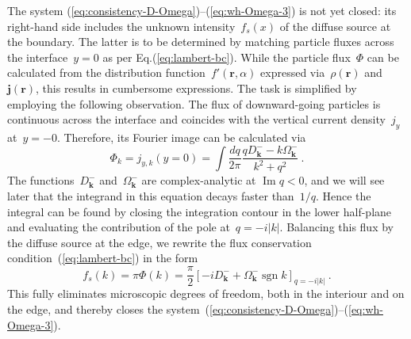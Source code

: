 \documentclass[preprint,aps,eqsecnum]{revtex4-1}
\newcommand{\fminus}[1]{{#1}^{-}}
\renewcommand{\Im}{\mathop{\mathrm{Im}}\nolimits}
\newcommand{\sgn}{\mathop{\mathrm{sgn}}\nolimits}
\begin{document}
The system (\ref{eq:consistency-D-Omega})--(\ref{eq:wh-Omega-3})
is not yet closed:
its right-hand side includes the unknown intensity~$f_s(x)$
of the diffuse source at the boundary.
The latter is to be determined by matching particle fluxes across the
interface~$y = 0$ as per Eq.(\ref{eq:lambert-bc}).
While the particle flux~$\Phi$ can be calculated from
the distribution function~$f'({\bm r}, \alpha)$ expressed
via~$\rho({\bm r})$ and~${\bm j}({\bm r})$, 
this results in cumbersome expressions.
The task is simplified by employing the following observation.
The flux of downward-going particles is continuous across the interface
and coincides with the vertical current density~$j_y$ at~$y = -0$.
Therefore, its Fourier image can be calculated via
\begin{equation}
  \Phi_{k} = j_{y, k}(y=0)
  = \int \frac{dq}{2\pi}
          \frac{q \fminus{D}_{\bm k} - k\fminus{\Omega}_{\bm k}}{k^2 + q^2}
  \ .
\end{equation}
The functions~$\fminus{D}_{\bm k}$ and~$\fminus{\Omega}_{\bm k}$ are
complex-analytic at $\Im q < 0$, and we will see later that the integrand
in this equation decays faster than~$1/q$. Hence the integral can be found
by closing the integration contour in the lower half-plane and evaluating
the contribution of the pole at~$q = -i |k|$. Balancing this flux by the
diffuse source at the edge,
we rewrite the flux conservation condition~(\ref{eq:lambert-bc}) in the form
\begin{equation}
  \label{eq:Phi-D-Omega}
  f_s(k) = \pi\Phi(k) =  \frac{\pi}{2}
      \left[-i\fminus{D}_{\bm k}
           + \fminus{\Omega}_{\bm k} \sgn k\right]_{q  = -i |k|}
  \ .
\end{equation}
This fully eliminates microscopic degrees of freedom, both in
the interiour and on the edge, and thereby
closes the system~(\ref{eq:consistency-D-Omega})--(\ref{eq:wh-Omega-3}).
\end{document}
